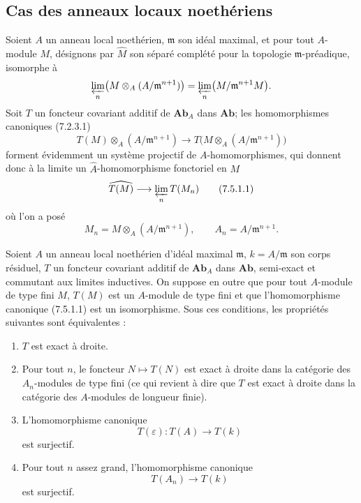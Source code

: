 \subsection{Cas des anneaux locaux noethériens}
\label{subsection:III.7.5.fr}

\begin{env}[7.5.1]
Soient $A$ un anneau local noethérien, $\mathfrak m$ son idéal maximal, et pour
tout $A$-module $M$, désignons par $\widehat M$ son séparé complété pour la
topologie $\mathfrak m$-préadique, isomorphe à
\[
  \varprojlim_n\bigl(M\otimes_A(A/\mathfrak m^{n+1})\bigr)
  =
  \varprojlim_n\bigl(M/\mathfrak m^{n+1}M\bigr).
\]
Soit $T$ un foncteur covariant additif de $\mathbf{Ab}_A$ dans $\mathbf{Ab}$;
les homomorphismes canoniques (7.2.3.1)
\[
  T(M)\otimes_A(A/\mathfrak m^{n+1})
  \longrightarrow
  T\bigl(M\otimes_A(A/\mathfrak m^{n+1})\bigr)
\]
forment évidemment un système projectif de $A$-homomorphismes, qui donnent donc
à la limite un $\widehat A$-homomorphisme fonctoriel en $M$
\[
  \widehat{T(M)}
  \longrightarrow
  \varprojlim_n T(M_n)
  \tag{7.5.1.1}\label{III.7.5.1.1.fr}
\]
où l'on a posé
\[
  M_n=M\otimes_A(A/\mathfrak m^{n+1}),
  \qquad
  A_n=A/\mathfrak m^{n+1}.
\]
\end{env}

\begin{proposition}[7.5.2]
Soient $A$ un anneau local noethérien d'idéal maximal $\mathfrak m$,
$k=A/\mathfrak m$ son corps résiduel, $T$ un foncteur covariant additif de
$\mathbf{Ab}_A$ dans $\mathbf{Ab}$, semi-exact et commutant aux limites
inductives. On suppose en outre que pour tout $A$-module de type fini $M$,
$T(M)$ est un $A$-module de type fini et que l'homomorphisme canonique
(7.5.1.1) est un isomorphisme. Sous ces conditions, les propriétés suivantes
sont équivalentes :
\begin{enumerate}
  \item[a)] $T$ est exact à droite.
  \item[b)] Pour tout $n$, le foncteur $N\mapsto T(N)$ est exact à droite dans
    la catégorie des $A_n$-modules de type fini (ce qui revient à dire que $T$
    est exact à droite dans la catégorie des $A$-modules de longueur finie).
  \item[c)] L'homomorphisme canonique
    \[
      T(\varepsilon):T(A)\longrightarrow T(k)
    \]
    est surjectif.
  \item[d)] Pour tout $n$ assez grand, l'homomorphisme canonique
    \[
      T(A_n)\longrightarrow T(k)
    \]
    est surjectif.
\end{enumerate}
\end{proposition}


